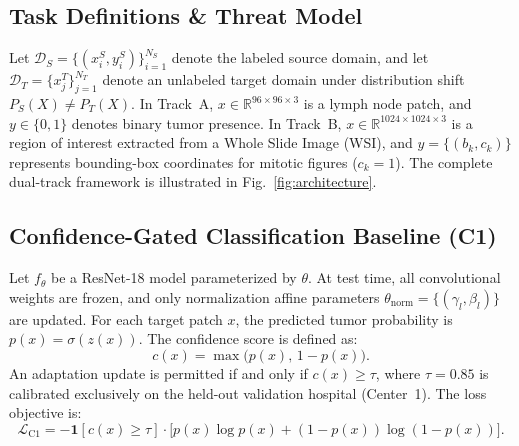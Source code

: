 \documentclass[conference]{IEEEtran}
\begin{document}
\subsection{Task Definitions \& Threat Model}
Let $\mathcal{D}_S = \{(x_i^S, y_i^S)\}_{i=1}^{N_S}$ denote the labeled source domain, and let $\mathcal{D}_T = \{x_j^T\}_{j=1}^{N_T}$ denote an unlabeled target domain under distribution shift $P_S(X) \ne P_T(X)$.
In Track~A, $x \in \mathbb{R}^{96 \times 96 \times 3}$ is a lymph node patch, and $y \in \{0, 1\}$ denotes binary tumor presence.
In Track~B, $x \in \mathbb{R}^{1024 \times 1024 \times 3}$ is a region of interest extracted from a Whole Slide Image (WSI), and $y = \{(b_k, c_k)\}$ represents bounding-box coordinates for mitotic figures ($c_k = 1$).
The complete dual-track framework is illustrated in Fig.~\ref{fig:architecture}.

\subsection{Confidence-Gated Classification Baseline (C1)}
Let $f_\theta$ be a ResNet-18 model parameterized by $\theta$. At test time, all convolutional weights are frozen, and only normalization affine parameters $\theta_{\text{norm}} = \{(\gamma_l, \beta_l)\}$ are updated. For each target patch $x$, the predicted tumor probability is $p(x) = \sigma(z(x))$. The confidence score is defined as:
\begin{equation}
    c(x) = \max\bigl(p(x),\, 1 - p(x)\bigr).
\end{equation}
An adaptation update is permitted if and only if $c(x) \ge \tau$, where $\tau = 0.85$ is calibrated exclusively on the held-out validation hospital (Center~1). The loss objective is:
\begin{equation}
    \mathcal{L}_{\text{C1}} = - \mathbf{1}[c(x) \ge \tau] \cdot \bigl[ p(x)\log p(x) + (1-p(x))\log(1-p(x)) \bigr].
\end{equation}
\end{document}
